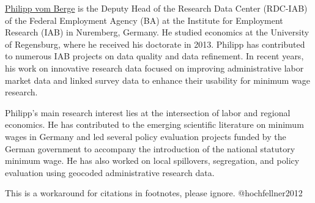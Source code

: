 \href{https://www.iab.de/754/section.aspx/Mitarbeiter/72110}{Philipp vom Berge} is the Deputy Head of the Research Data Center (RDC-IAB) of the Federal Employment Agency (BA) at the Institute for Employment Research (IAB) in Nuremberg, Germany. He studied economics at the University of Regensburg, where he received his doctorate in 2013. Philipp has contributed to numerous IAB projects on data quality and data refinement. In recent years, his work on innovative research data focused on improving administrative labor market data and linked survey data to enhance their usability for minimum wage research.

Philipp's main research interest lies at the intersection of labor and regional economics. He has contributed to the emerging scientific literature on minimum wages in Germany and led several policy evaluation projects funded by the German government to accompany the introduction of the national statutory minimum wage. He has also worked on local spillovers, segregation, and policy evaluation using geocoded administrative research data.

\begin{invisible}
This is a workaround for citations in footnotes, please ignore.
@hochfellner2012
\end{invisible}

\putbib

